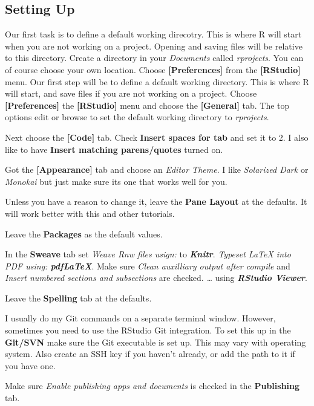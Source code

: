 \documentclass{article}\usepackage[]{graphicx}\usepackage[]{color}
\begin{document}
\subsection*{Setting Up}
 Our first task is to define a default working direcotry. This is where R will start when you are not working on a project. Opening and saving files will be relative to this directory. Create a directory in your \textit{Documents} called \textit{rprojects}. You can of course choose your own location. Choose \textbf{[Preferences]} from the \textbf{[RStudio]} menu. Our first step will be to define a default working directory. This is where R will start, and save files if you are not working on a project. Choose \textbf{[Preferences]} the \textbf{[RStudio]} menu and choose the \textbf{[General]} tab. The top options edit or browse to set the default working directory to \textit{rprojects}.
 
 
 Next choose the \textbf{[Code]} tab. Check \textbf{Insert spaces for tab} and set it to 2. I also like to have \textbf{Insert matching parens/quotes} turned on. 
 
 Got the \textbf{[Appearance]} tab and choose an \textit{Editor Theme}. I like \textit{Solarized Dark} or \textit{Monokai} but just make sure its one that works well for you. 
 
 Unless you have a reason to change it, leave the \textbf{Pane Layout} at the defaults. It will work better with this and other tutorials.
 
 Leave the \textbf{Packages} as the default values.
 
 In the \textbf{Sweave} tab set \textit{Weave Rnw files usign: } to \textbf{\textit{Knitr}}. \textit{Typeset LaTeX into PDF using: \textbf{pdfLaTeX}}. Make sure \textit{Clean auxilliary output after compile} and \textit{Insert numbered sections and subsections} are checked. \textit{\ldots} using \textbf{\textit{RStudio Viewer}}. 
 
 Leave the \textbf{Spelling} tab at the defaults.
 
 I usually do my Git commands on a separate terminal window. However, sometimes you need to use the RStudio Git integration. To set this up in the \textbf{Git/SVN} make sure the Git executable is set up. This may vary with operating system. Also create an SSH key if you haven't already, or add the path to it if you have one.
 
 Make sure \textit{Enable publishing apps and documents} is checked in the \textbf{Publishing} tab.

 
\end{document}
